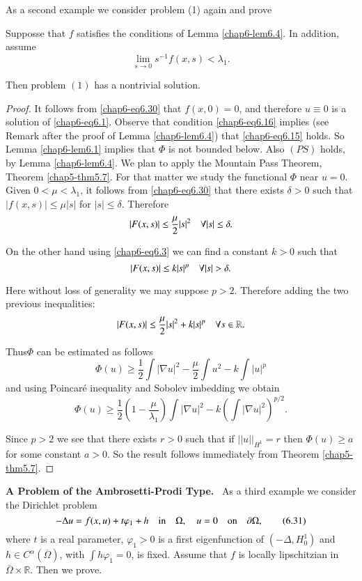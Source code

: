As a second example we consider problem (1) again and prove

\begin{theorem}\label{chap6-thm6.9}
Supposse that $f$ satisfies the conditions of Lemma
\ref{chap6-lem6.4}. In addition, assume
\begin{equation*}
\lim\limits_{s\to
  0}s^{-1}f(x,s)<\lambda_{1}.\tag{6.30}\label{chap6-eq6.30} 
\end{equation*}

Then problem $(1)$ has a nontrivial solution.
\end{theorem}

\begin{proof}
It follows from \eqref{chap6-eq6.30} that $f(x,0)=0$, and therefore
$u\equiv 0$ is a solution of \eqref{chap6-eq6.1}. Observe that
condition \eqref{chap6-eq6.16} implies (see Remark after the proof of
Lemma \ref{chap6-lem6.4}) that \eqref{chap6-eq6.15} holds. So Lemma
\ref{chap6-lem6.1} implies that $\Phi$ is not bounded below. Also
$(PS)$ holds, by Lemma \ref{chap6-lem6.4}. We plan to apply the
Mountain Pass Theorem, Theorem \ref{chap5-thm5.7}. For that matter we
study the functional $\Phi$ near $u=0$. Given $0<\mu<\lambda_{1}$, it
follows from \eqref{chap6-eq6.30} that there exists $\delta>0$ such
that $|f(x,s)|\leq \mu|s|$ for $|s|\leq \delta$. Therefore
$$
|F(x,s)|\leq \frac{\mu}{2}|s|^{2}\quad \forall |s|\leq \delta.
$$

On the other hand using \eqref{chap6-eq6.3} we can find a constant
$k>0$ such that
$$
|F(x,s)|\leq k|s|^{p}\q \forall |s|>\delta.
$$

Here without loss of generality we may suppose $p>2$. Therefore adding
the two previous inequalities:
$$
|F(x,s)|\leq \frac{\mu}{2}|s|^{2}+k|s|^{p}\quad \forall s\in \mathbb{R}.
$$

Thus\pageoriginale $\Phi$ can be estimated as follows
$$
\Phi(u)\geq \frac{1}{2}\int |\nabla u|^{2}-\frac{\mu}{2}\int
u^{2}-k\int |u|^{p}
$$
and using Poincar\'e inequality and Sobolev imbedding we obtain
$$
\Phi(u)\geq \frac{1}{2}\left(1-\frac{\mu}{\lambda_{1}}\right)\int
|\nabla u|^{2}-k\left(\int|\nabla u|^{2}\right)^{p/2}. 
$$

Since $p>2$ we see that there exists $r>0$ such that if
$||u||_{H^{1}}=r$ then $\Phi(u)\geq a$ for some constant $a>0$. So the
result follows immediately from Theorem \ref{chap5-thm5.7}. 
\end{proof}

\noindent
{\bf A Problem of the Ambrosetti-Prodi Type.}~ As a third example we
consider the Dirichlet problem
\begin{equation*}
-\Delta u=f(x,u)+t\varphi_{1}+h\quad\text{in}\quad \Omega,\quad u=0\quad
\text{on}\quad \partial \Omega,\tag{6.31}\label{chap6-eq6.31} 
\end{equation*}
where $t$ is a real parameter, $\varphi_{1}>0$ is a first
eigenfunction of $(-\Delta,H^{1}_{0})$ and $h\in
C^{\alpha}(\overline{\Omega})$, with $\int h\varphi_{1}=0$, is
fixed. Assume that $f$ is locally lipschitzian in
$\overline{\Omega}\times \mathbb{R}$. Then we prove.

